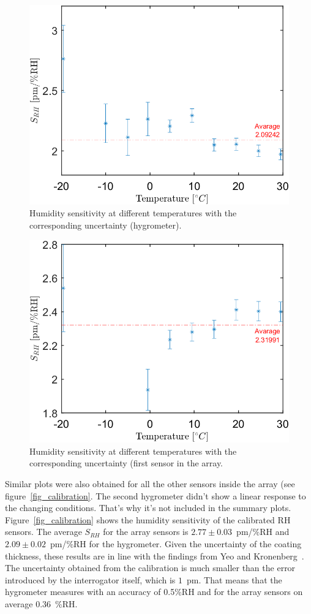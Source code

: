 \begin{figure}[!h]
\centering
\includegraphics[width=0.55\columnwidth]{Chapter5/images/RHS_RH.png}
\caption{Humidity sensitivity at different temperatures with the corresponding uncertainty (hygrometer).}
\label{fig_RH_sens}
\end{figure}
\begin{figure}[!h]
\centering
\includegraphics[width=0.55\columnwidth]{Chapter5/images/RH1_RH.png}
\caption{Humidity sensitivity at different temperatures with the corresponding uncertainty (first sensor in the array.}
\label{fig_RH_sens2}
\end{figure}
Similar plots were also obtained for all the other sensors inside the array (see figure~\ref{fig_calibration}. The second hygrometer didn't show a linear response to the changing conditions. That's why it's not included in the summary plots. Figure~\ref{fig_calibration} shows the humidity sensitivity of the calibrated \gls{RH} sensors. The average $S_{RH}$ for the array sensors is $2.77\pm0.03$~pm/\%RH  and $2.09\pm0.02$~pm/\%RH for the hygrometer. Given the uncertainty of the coating thickness, these results are in line with the findings from Yeo and Kronenberg~\cite{Kronenberg:02,YEO_PI}. The uncertainty obtained from the calibration is much smaller than the error introduced by the interrogator itself, which is $1$~pm. That means that the hygrometer measures with an accuracy of 0.5\%RH and for the array sensors on average $0.36$~\%RH. 
